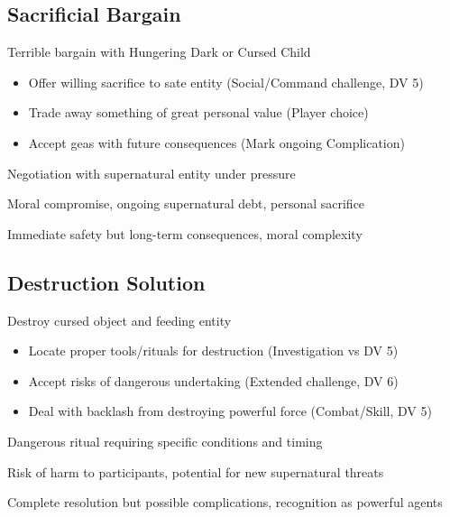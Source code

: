 \documentclass[11pt]{article}
\newenvironment{resolution}[1]{\begin{description}[leftmargin=*,style=standard]\item[\textbf{#1}]}{\end{description}}
\begin{document}
\subsection{Sacrificial Bargain}
\begin{resolution}{Sacrificial Bargain}
\item[Nature:] Terrible bargain with Hungering Dark or Cursed Child
\item[Options:] 
  \begin{itemize}
    \item Offer willing sacrifice to sate entity (Social/Command challenge, DV 5)
    \item Trade away something of great personal value (Player choice)
    \item Accept geas with future consequences (Mark ongoing Complication)
  \end{itemize}
\item[Procedure:] Negotiation with supernatural entity under pressure
\item[Costs:] Moral compromise, ongoing supernatural debt, personal sacrifice
\item[Outcome:] Immediate safety but long-term consequences, moral complexity
\end{resolution}

\subsection{Destruction Solution}
\begin{resolution}{Destruction Solution}
\item[Approach:] Destroy cursed object and feeding entity
\item[Requirements:] 
  \begin{itemize}
    \item Locate proper tools/rituals for destruction (Investigation vs DV 5)
    \item Accept risks of dangerous undertaking (Extended challenge, DV 6)
    \item Deal with backlash from destroying powerful force (Combat/Skill, DV 5)
  \end{itemize}
\item[Procedure:] Dangerous ritual requiring specific conditions and timing
\item[Costs:] Risk of harm to participants, potential for new supernatural threats
\item[Outcome:] Complete resolution but possible complications, recognition as powerful agents
\end{resolution}
\end{document}
